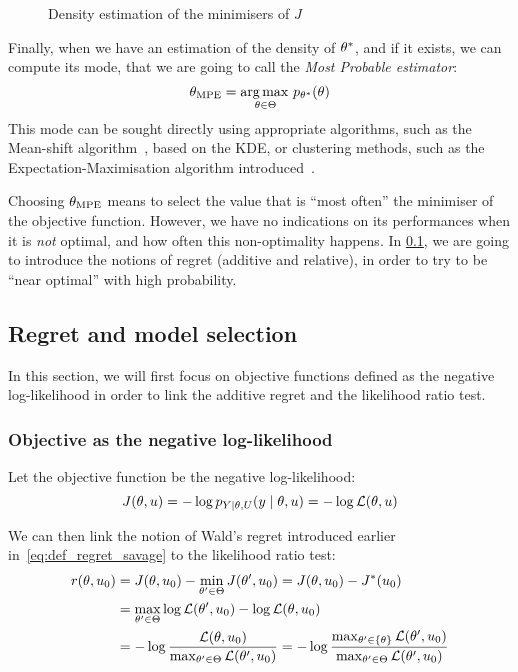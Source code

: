 \documentclass[../../Main_ManuscritThese.tex]{subfiles}
\newcommand\imgpath{/home/victor/acadwriting/Manuscrit/Text/Chapter3/img/}
\begin{document}
\begin{figure}[ht]
  \centering
  
  \caption{\label{fig:theta_star_samples} Density estimation of the minimisers of $J$}
\end{figure}

Finally, when we have an estimation of the density of $\theta^*$, and if it exists, we can compute its mode, that we are going to call the \emph{Most Probable estimator}:
\begin{equation}
  {\theta}_{\mathrm{MPE}} = \operatorname*{arg\,max \,}_{\theta \in \Theta} p_{\theta^*}(\theta)
\end{equation}
This mode can be sought directly using appropriate algorithms, such as the Mean-shift algorithm~\cite{yizong_cheng_mean_1995}, based on the KDE, or clustering methods, such as the Expectation-Maximisation algorithm introduced~\cite{dempster_maximum_1977}.

Choosing ${\theta}_{\mathrm{MPE}}$ means to select the value that is
``most often'' the minimiser of the objective function. However, we
have no indications on its performances when it is \emph{not} optimal,
and how often this non-optimality happens.  In \cref{sec:regret}, we
are going to introduce the notions of regret (additive and relative),
in order to try to be ``near optimal'' with high probability.


\subsection{Regret and model selection}
\label{sec:regret}
In this section, we will first focus on objective functions defined as
the negative log-likelihood in order to link the additive regret and
the likelihood ratio test.
\subsubsection{Objective as the negative log-likelihood}

Let the objective function be the negative log-likelihood:
\begin{equation}
  J(\theta, u) = - \log p_{Y\mid \theta, U}(y \mid \theta, u) = -\log \mathcal{L}(\theta,u)
\end{equation}

We can then link the notion of Wald's regret introduced earlier in~\cref{eq:def_regret_savage} to the likelihood ratio test:
  \begin{align}
    r(\theta,u_0) &= J(\theta, u_0) - \min_{\theta^{\prime}\in\Theta}J(\theta^{\prime}, u_0) = J(\theta,u_0) - J^*(u_0)  \\
                 &= \max_{\theta^{\prime}\in\Theta} \log \mathcal{L}(\theta^{\prime}, u_0) - \log \mathcal{L}(\theta, u_0) \\
                 &= -\log \frac{\mathcal{L}(\theta, u_0)}{\max_{\theta^{\prime}\in\Theta}\mathcal{L}(\theta^{\prime}, u_0)} = -\log \frac{\max_{\theta^{\prime}\in\{\theta\}}\mathcal{L}(\theta^{\prime}, u_0)}{\max_{\theta^{\prime}\in\Theta}\mathcal{L}(\theta^{\prime}, u_0)}
  \end{align}
\end{document}
